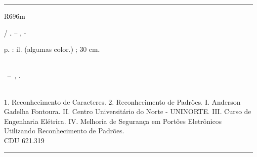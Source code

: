 
%
%     
\begin{fichacatalografica}
	\vspace*{\fill}					%
	\hrule							%
	\begin{flushleft}
		R696m
	\end{flushleft}
	\begin{center}					%
	\begin{minipage}[c]{12.5cm}		%
	
	\imprimirautor
	
	\hspace{0.5cm} \imprimirtitulo  / \imprimirautor. --
	\imprimirlocal, \imprimirdata-
	
	\hspace{0.5cm} \pageref{LastPage} p. : il. (algumas color.) ; 30 cm.\\
	
	\hspace{0.5cm} \imprimirorientadorRotulo~\imprimirorientador\\
	
	\hspace{0.5cm}
	\parbox[t]{\textwidth}{\imprimirtipotrabalho~--~\imprimirinstituicao,
	\imprimirdata.}\\
	
	\hspace{0.5cm}
		1. Reconhecimento de Caracteres.
		2. Reconhecimento de Padrões.
		I. Anderson Gadelha Fontoura.
		II. Centro Universitário do Norte - UNINORTE.
		III. Curso de Engenharia Elétrica.
		IV. Melhoria de Segurança em Portões Eletrônicos Utilizando Reconhecimento de Padrões.\\ 			
	
	\hspace{8.75cm} CDU 621.319\\
	
	\end{minipage}
	\end{center}
	\hrule
\end{fichacatalografica}
